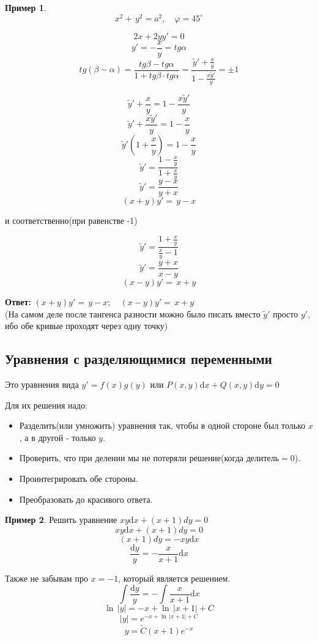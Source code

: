 \documentclass[a4paper, 14pt]{article}
\newcommand{\dx}{\mathrm{d}x}
\newcommand{\dy}{\mathrm{d}y}
\renewcommand{\phi}{\varphi}
\theoremstyle{definition}
\newtheorem*{example}{Пример}
\newenvironment{answer}
  {\par\noindent\textbf{Ответ:}}
  {\par}
\begin{document}
\begin{example}

\[x^2 +\,y^2 = a^2, \quad \phi = 45^{\circ}\]

\[2x + 2yy' = 0\]
\[y' = -\frac{x}{y} = tg{\alpha}\]
\[tg{(\beta - \alpha)} = \frac{tg{\beta} - tg{\alpha}}{1 + tg{\beta}\cdot tg{\alpha}} = \frac{\tilde{y}' + \frac{x}{y}}{1-\frac{x\tilde{y}'}{y}}= \pm 1\]


\[\tilde{y}' + \frac{x}{y} = 1-\frac{x\tilde{y}'}{y}\]
\[\tilde{y}' + \frac{x\tilde{y}'}{y} = 1 - \frac{x}{y}\]
\[\tilde{y}'(1 + \frac{x}{y}) = 1 - \frac{x}{y}\]
\[\tilde{y}' = \frac{1 - \frac{x}{y}}{1 + \frac{x}{y}}\] 
\[\tilde{y}' = \frac{y-x}{y+x}\]
\[(x+y)y' =\,y - x\]

и соответственно(при равенстве -1) 

\[\tilde{y}' = \frac{1 + \frac{x}{y}}{\frac{x}{y} - 1}\]
\[\tilde{y}' = \frac{y+x}{x-y}\]
\[(x-y)y' =\,x+y\]
\end{example}
\begin{answer}
$(x+y)y' =\,y - x; \quad (x-y)y' =\,x + y$\\
(На самом деле после тангенса разности можно было писать вместо $\tilde{y}'$ просто $y'$, ибо обе кривые проходят через одну точку)
\end{answer} 

\subsection{Уравнения с разделяющимися переменными}

Это уравнения вида $y' = f(x)g(y)$ или $P(x, y)\dx + Q(x, y)\dy = 0$
\medskip

Для их решения надо:
\begin{itemize}
\item \textbf{}Разделить(или умножить) уравнения так, чтобы в одной стороне был только $x$, а в другой - только $y$.
\item \textbf{}Проверить, что при делении мы не потеряли решение(когда делитель$=0$).
\item \textbf{}Проинтегрировать обе стороны.
\item \textbf{}Преобразовать до красивого ответа.
\end{itemize}
\begin{example}
Решить уравнение $xy\dx+(x+1)dy=0$
\[xy\dx+(x+1)dy=0\]
\[(x+1)dy = -xy\dx\]
\[\frac{\dy}{y} = - \frac{x}{x+1}\dx\] 

Также не забывам про $x=-1$, который является решением.
\[\int \frac{\dy}{y} = - \int \frac{x}{x+1}\dx\]
\[\ln{\,|y|} = -x + \ln{\,|x+1| + C}\]
\[|y| = e^{-x + \ln{\,|x+1| + C}}\]
\[y = \tilde{C}(x+1)e^{-x}\]
\end{example}
\end{document}
